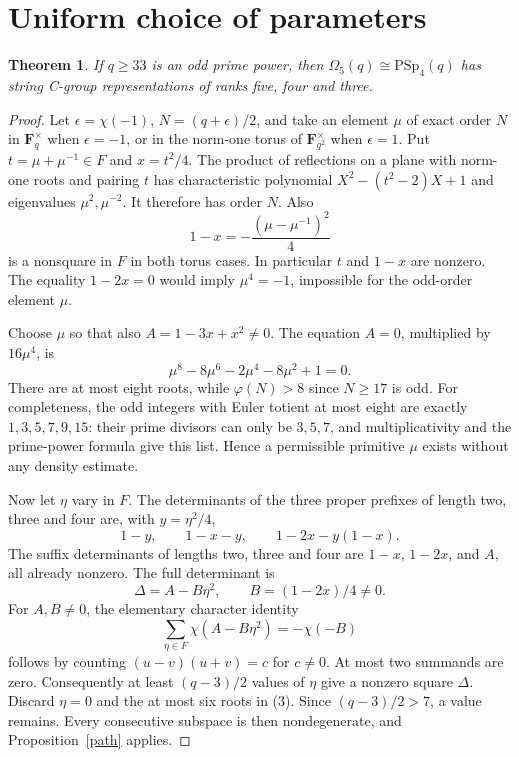 \documentclass[11pt,a4paper]{article}
\newtheorem{theorem}{Theorem}
\newcommand{\F}{\mathbf F}
\newcommand{\Om}{\Omega}
\begin{document}
\section{Uniform choice of parameters}
\begin{theorem}\label{uniform}
If $q\ge33$ is an odd prime power, then $\Om_5(q)\cong
\mathrm{PSp}_4(q)$ has string C-group representations of ranks
five, four and three.
\end{theorem}
\begin{proof}
Let $\epsilon=\chi(-1)$, $N=(q+\epsilon)/2$, and take an element
$\mu$ of exact order $N$ in $\F_q^\times$ when $\epsilon=-1$,
or in the norm-one torus of $\F_{q^2}^\times$ when
$\epsilon=1$. Put $t=\mu+\mu^{-1}\in F$ and $x=t^2/4$.
The product of reflections on a plane with norm-one roots and
pairing $t$ has characteristic polynomial
$X^2-(t^2-2)X+1$ and eigenvalues $\mu^2,\mu^{-2}$.
It therefore has order $N$. Also
\[
 1-x=-\frac{(\mu-\mu^{-1})^2}{4}
\]
is a nonsquare in $F$ in both torus cases. In particular $t$ and
$1-x$ are nonzero. The equality $1-2x=0$ would imply
$\mu^4=-1$, impossible for the odd-order element $\mu$.

Choose $\mu$ so that also $A=1-3x+x^2\ne0$.
The equation $A=0$, multiplied by $16\mu^4$, is
\[
 \mu^8-8\mu^6-2\mu^4-8\mu^2+1=0.                 \tag{2}
\]
There are at most eight roots, while $\varphi(N)>8$ since
$N\ge17$ is odd. For completeness, the odd integers with
Euler totient at most eight are exactly $1,3,5,7,9,15$:
their prime divisors can only be $3,5,7$, and multiplicativity
and the prime-power formula give this list. Hence a permissible
primitive $\mu$ exists without any density estimate.

Now let $\eta$ vary in $F$. The determinants of the three
proper prefixes of length two, three and four are, with
$y=\eta^2/4$,
\[
 1-y,\qquad 1-x-y,\qquad 1-2x-y(1-x).             \tag{3}
\]
The suffix determinants of lengths two, three and four are
$1-x$, $1-2x$, and $A$, all already nonzero. The full determinant
is
\[
 \Delta=A-B\eta^2,\qquad B=(1-2x)/4\ne0.          \tag{4}
\]
For $A,B\ne0$, the elementary character identity
\[
 \sum_{\eta\in F}\chi(A-B\eta^2)=-\chi(-B)
\]
follows by counting $(u-v)(u+v)=c$ for $c\ne0$.
At most two summands are zero. Consequently at least
$(q-3)/2$ values of $\eta$ give a nonzero square $\Delta$.
Discard $\eta=0$ and the at most six roots in (3). Since
$(q-3)/2>7$, a value remains. Every consecutive subspace is
then nondegenerate, and Proposition~\ref{path} applies.
\end{proof}
\end{document}
